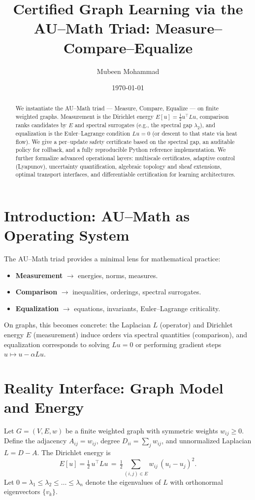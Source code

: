 \documentclass[11pt]{article}
\title{Certified Graph Learning via the AU--Math Triad: Measure--Compare--Equalize}
\author{Mubeen Mohammad}
\date{\today}
\begin{document}
\maketitle

\begin{abstract}
We instantiate the AU--Math triad --- Measure, Compare, Equalize --- on finite weighted graphs. Measurement is the Dirichlet energy $E[u]=\tfrac12 u^\top L u$, comparison ranks candidates by $E$ and spectral surrogates (e.g., the spectral gap $\lambda_2$), and equalization is the Euler--Lagrange condition $Lu=0$ (or descent to that state via heat flow). We give a per--update safety certificate based on the spectral gap, an auditable policy for rollback, and a fully reproducible Python reference implementation. We further formalize advanced operational layers: multiscale certificates, adaptive control (Lyapunov), uncertainty quantification, algebraic topology and sheaf extensions, optimal transport interfaces, and differentiable certification for learning architectures.
\end{abstract}

\section{Introduction: AU--Math as Operating System}
The AU--Math triad provides a minimal lens for mathematical practice:
\begin{itemize}[leftmargin=1.2em]
  \item \textbf{Measurement} $\to$ energies, norms, measures.
  \item \textbf{Comparison} $\to$ inequalities, orderings, spectral surrogates.
  \item \textbf{Equalization} $\to$ equations, invariants, Euler--Lagrange criticality.
\end{itemize}
On graphs, this becomes concrete: the Laplacian $L$ (operator) and Dirichlet energy $E$ (measurement) induce orders via spectral quantities (comparison), and equalization corresponds to solving $Lu=0$ or performing gradient steps $u\mapsto u-\alpha L u$.

\section{Reality Interface: Graph Model and Energy}
Let $G=(V,E,w)$ be a finite weighted graph with symmetric weights $w_{ij}\ge 0$. Define the adjacency $A_{ij}=w_{ij}$, degree $D_{ii}=\sum_j w_{ij}$, and unnormalized Laplacian $L=D-A$. The Dirichlet energy is
\begin{equation}
E[u]=\tfrac12\,u^\top L u \,=\, \tfrac12\sum_{(i,j)\in E} w_{ij}\,(u_i-u_j)^2.\label{eq:energy}
\end{equation}
Let $0=\lambda_1\le\lambda_2\le\dots\le\lambda_n$ denote the eigenvalues of $L$ with orthonormal eigenvectors $\{v_k\}$.
\end{document}
